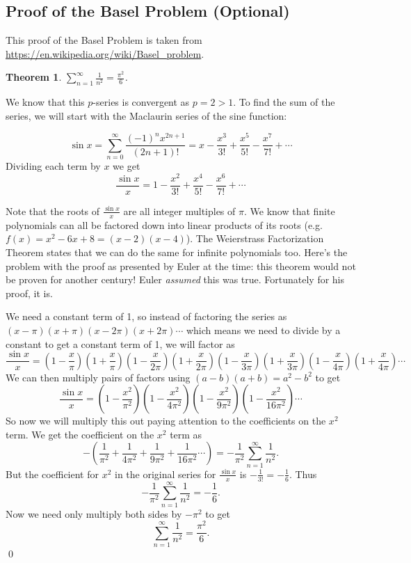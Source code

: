 \documentclass[letterpaper, 11pt, openany]{book}
\theoremstyle{mytheoremstyle}
\newtheorem{theorem}{Theorem}[section]
\renewenvironment{proof}{{\par \sffamily \smaller \fontseries{b}\selectfont Proof}}{\hfill\qed}
\theoremstyle{myexamplestyle}
\begin{document}
\subsection{Proof of the Basel Problem (Optional)}
This proof of the Basel Problem is taken from \url{https://en.wikipedia.org/wiki/Basel_problem}.
\begin{theorem}
	$\displaystyle \sum_{n=1}^{\infty}\frac{1}{n^2} = \frac{\pi^2}{6}$.
\end{theorem}

\begin{proof}
    We know that this $p$-series is convergent as $p=2>1$. To find the sum of the series, we will start with the Maclaurin series of the sine function:

    \[\sin x = \sum_{n=0}^{\infty} \frac{(-1)^n x^{2n+1}}{(2n+1)!} = x - \frac{x^3}{3!} + \frac{x^5}{5!} - \frac{x^7}{7!} + \cdots\]
    Dividing each term by $x$ we get 
    \[\frac{\sin x}{x} = 1 - \frac{x^2}{3!} + \frac{x^4}{5!} - \frac{x^6}{7!} + \cdots\]

    Note that the roots of $\frac{\sin x}{x}$ are all integer multiples of $\pi$. We know that finite polynomials can all be factored down into linear products of its roots (e.g. $f(x) = x^2 - 6x + 8 = (x-2)(x-4)$). The Weierstrass Factorization Theorem states that we can do the same for infinite polynomials too. Here's the problem with the proof as presented by Euler at the time: this theorem would not be proven for another century! Euler \textit{assumed} this was true. Fortunately for his proof, it is.

    We need a constant term of 1, so instead of factoring the series as $(x-\pi)(x+\pi)(x-2\pi)(x+2\pi)\cdots$ which means we need to divide by a constant to get a constant term of 1, we will factor as
    \[\frac{\sin x}{x} = \left(1-\frac{x}{\pi}\right)\left(1+\frac{x}{\pi}\right) \left(1-\frac{x}{2\pi}\right) \left(1+\frac{x}{2\pi}\right)\left(1-\frac{x}{3\pi}\right) \left(1+\frac{x}{3\pi}\right)\left(1-\frac{x}{4\pi}\right) \left(1+\frac{x}{4\pi}\right)\cdots\]
    We can then multiply pairs of factors using $(a-b)(a+b) = a^2-b^2$ to get
    \[
                        \frac{\sin x}{x} = \left(1-\frac{x^2}{\pi^2}\right)\left(1-\frac{x^2}{4\pi^2}\right)\left(1-\frac{x^2}{9\pi^2}\right)\left(1-\frac{x^2}{16\pi^2}\right)\cdots\]
    So now we will multiply this out paying attention to the coefficients on the $x^2$ term. We get the coefficient on the $x^2$ term as
    \[-\left(\frac{1}{\pi^2} + \frac{1}{4\pi^2} + \frac{1}{9\pi^2} + \frac{1}{16\pi^2}\cdots\right)= -\frac{1}{\pi^2}\sum_{n=1}^{\infty}\frac{1}{n^2}.\]
    But the coefficient for $x^2$ in the original series for $\frac{\sin x}{x}$ is $-\frac{1}{3!} = -\frac{1}{6}$. Thus
    \[-\frac{1}{\pi^2}\sum_{n=1}^{\infty}\frac{1}{n^2} = -\frac{1}{6} .\]
    Now we need only multiply both sides by $-\pi^2$ to get
    \[\sum_{n=1}^{\infty}\frac{1}{n^2} = \frac{\pi^2}{6}.\]
\end{proof}
\end{document}

